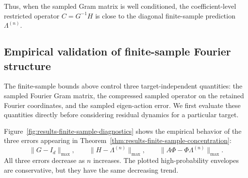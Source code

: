 
Thus, when the sampled Gram matrix is well conditioned, the coefficient-level
restricted operator \(C=G^{-1}H\) is close to the diagonal finite-sample
prediction \(\Lambda^{(n)}\).

\subsection{Empirical validation of finite-sample Fourier structure}
\label{subsec:results-finite-sample-validation}

The finite-sample bounds above control three target-independent quantities: the
sampled Fourier Gram matrix, the compressed sampled operator on the retained
Fourier coordinates, and the sampled eigen-action error. We first evaluate these
quantities directly before considering residual dynamics for a particular
target.

Figure~\ref{fig:results-finite-sample-diagnostics} shows the empirical behavior
of the three errors appearing in
Theorem~\ref{thm:results-finite-sample-concentration}:
\[
	\|G-I_d\|_{\max},
	\qquad
	\|H-\Lambda^{(n)}\|_{\max},
	\qquad
	\|A\Phi-\Phi\Lambda^{(n)}\|_{\max}.
\]
All three errors decrease as \(n\) increases. The plotted high-probability
envelopes are conservative, but they have the same decreasing trend.

